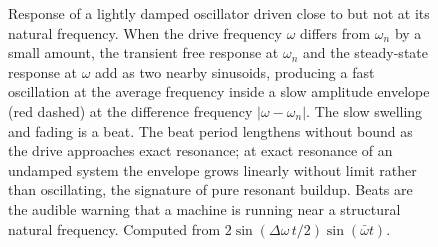 \begin{figure}[htbp]
\centering
{}
\caption[Beating near resonance]{Response of a lightly damped
oscillator driven close to but not at its natural frequency. When the
drive frequency $\omega$ differs from $\omega_n$ by a small amount,
the transient free response at $\omega_n$ and the steady-state
response at $\omega$ add as two nearby sinusoids, producing a fast
oscillation at the average frequency inside a slow amplitude envelope
(red dashed) at the difference frequency $|\omega-\omega_n|$. The
slow swelling and fading is a beat. The beat period lengthens without
bound as the drive approaches exact resonance; at exact resonance of
an undamped system the envelope grows linearly without limit rather
than oscillating, the signature of pure resonant buildup. Beats are
the audible warning that a machine is running near a structural
natural frequency. Computed from $2\sin(\Delta\omega\,t/2)\sin(\bar\omega t)$.}
\label{fig:vol03ch06:beat}
\end{figure}
